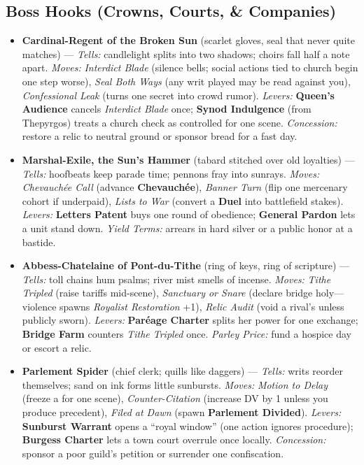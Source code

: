 \subsection*{Boss Hooks (Crowns, Courts, \& Companies)}
\label{sec:vhasia-bosses}

\begin{itemize}
  \item \textbf{Cardinal-Regent of the Broken Sun} (scarlet gloves, seal that never quite matches) --- \emph{Tells:} candlelight splits into two shadows; choirs fall half a note apart. \emph{Moves:} \emph{Interdict Blade} (silence bells; social actions tied to church begin one step worse), \emph{Seal Both Ways} (any writ played may be read against you), \emph{Confessional Leak} (turns one secret into crowd rumor). \emph{Levers:} \textbf{Queen's Audience} cancels \emph{Interdict Blade} once; \textbf{Synod Indulgence} (from Thepyrgos) treats a church check as controlled for one scene. \emph{Concession:} restore a relic to neutral ground or sponsor bread for a fast day.
  
  \item \textbf{Marshal-Exile, the Sun’s Hammer} (tabard stitched over old loyalties) --- \emph{Tells:} hoofbeats keep parade time; pennons fray into sunrays. \emph{Moves:} \emph{Chevauchée Call} (advance \textbf{Chevauchée}), \emph{Banner Turn} (flip one mercenary cohort if underpaid), \emph{Lists to War} (convert a \textbf{Duel} into battlefield stakes). \emph{Levers:} \textbf{Letters Patent} buys one round of obedience; \textbf{General Pardon} lets a unit stand down. \emph{Yield Terms:} arrears in hard silver or a public honor at a bastide.
  
  \item \textbf{Abbess-Chatelaine of Pont-du-Tithe} (ring of keys, ring of scripture) --- \emph{Tells:} toll chains hum psalms; river mist smells of incense. \emph{Moves:} \emph{Tithe Tripled} (raise tariffs mid-scene), \emph{Sanctuary or Snare} (declare bridge holy—violence spawns \emph{Royalist Restoration} +1), \emph{Relic Audit} (void a rival’s \Diamond{} unless publicly sworn). \emph{Levers:} \textbf{Paréage Charter} splits her power for one exchange; \textbf{Bridge Farm} counters \emph{Tithe Tripled} once. \emph{Parley Price:} fund a hospice day or escort a relic.
  
  \item \textbf{Parlement Spider} (chief clerk; quills like daggers) --- \emph{Tells:} writs reorder themselves; sand on ink forms little sunbursts. \emph{Moves:} \emph{Motion to Delay} (freeze a \Diamond{} for one scene), \emph{Counter-Citation} (increase DV by 1 unless you produce precedent), \emph{Filed at Dawn} (spawn \textbf{Parlement Divided}). \emph{Levers:} \textbf{Sunburst Warrant} opens a “royal window” (one action ignores procedure); \textbf{Burgess Charter} lets a town court overrule once locally. \emph{Concession:} sponsor a poor guild’s petition or surrender one confiscation.
  

\end{itemize}
